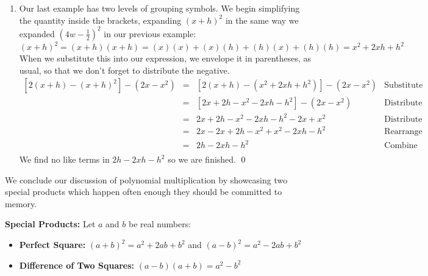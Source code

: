 \documentclass{ximera}
\begin{document}
\begin{example}
\begin{explanation}
\begin{enumerate}
\[\begin{array}{rclr}
& = & 16w^2 - 2w - 2w +  \frac{1}{4} &   \text{Multiply} \\ 
& = & 16w^2 - 4w +  \frac{1}{4} &   \text{Combine like terms} \\ 
\end{array}\]

Our (correct) final answer is $16w^2 - 4w + \frac{1}{4}$.

\item  Our last example has two levels of grouping symbols.  We begin simplifying the quantity inside the brackets, expanding $(x+h)^2$ in the same way we expanded $(4w - \frac{1}{2})^{2}$ in our previous example: \[ (x+h)^2 = (x+h)(x+h) = (x)(x) + (x)(h) + (h)(x) + (h)(h) = x^2 + 2xh + h^2 \]  When we substitute this into our expression, we envelope it in parentheses, as usual, so that we don't forget to distribute the negative.\[ \begin{array}{rclr}
					
\left[2(x+h) - (x+h)^2\right] - \left(2x - x^2 \right) & = & \left[2(x+h) - \left( x^2 + 2xh + h^2\right) \right] - \left(2x - x^2 \right) &  \text{Substitute} \\    & = & \left[2x+2h - x^2-2xh-h^2\right] - \left(2x - x^2 \right) & \text{Distribute}\\ 
& = & 2x+2h - x^2-2xh-h^2 -2x + x^2 &  \text{Distribute} \\ 
 & = & 2x - 2x+2h - x^2 + x^2 -2xh-h^2&  \text{Rearrange terms}\\
 & = & 2h-2xh-h^2&  \text{Combine like terms}\\
\end{array} \] We find no like terms in $2h-2xh-h^2$ so we are finished. \qed                                               

\end{enumerate}
\end{explanation}
\end{example}



We conclude our discussion of polynomial multiplication by showcasing two special products which happen often enough they should be committed to memory.

 


\begin{theorem}\label{SpecialProducts} \textbf{Special Products:} Let $a$ and $b$ be real numbers:

\begin{itemize}

\item \textbf{Perfect Square:}  $(a+b)^2 = a^2 + 2ab + b^2$ and $(a-b)^2 = a^2 - 2ab + b^2$

\item \textbf{Difference of Two Squares:}  $(a-b)(a+b) = a^2 - b^2$ 

\end{itemize}

\end{theorem}
\end{document}
